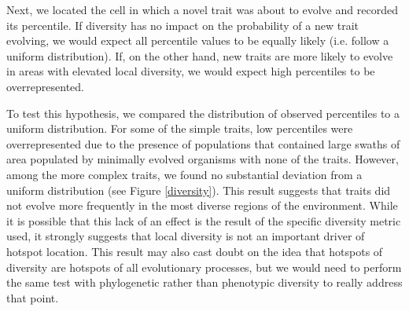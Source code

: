 Next, we located the cell in which a novel trait was about to evolve and recorded its percentile. If diversity has no impact on the probability of a new trait evolving, we would expect all percentile values to be equally likely (i.e. follow a uniform distribution). If, on the other hand, new traits are more likely to evolve in areas with elevated local diversity, we would expect high percentiles to be overrepresented.

To test this hypothesis, we compared the distribution of observed percentiles to a uniform distribution. For some of the simple traits, low percentiles were overrepresented due to the presence of populations that contained large swaths of area populated by minimally evolved organisms with none of the traits. However, among the more complex traits, we found no substantial deviation from a uniform distribution (see Figure \ref{diversity}). This result suggests that traits did not evolve more frequently in the most diverse regions of the environment. While it is possible that this lack of an effect is the result of the specific diversity metric used, it strongly suggests that local diversity is not an important driver of hotspot location. This result may also cast doubt on the idea that hotspots of diversity are hotspots of all evolutionary processes, but we would need to perform the same test with phylogenetic rather than phenotypic diversity to really address that point.




